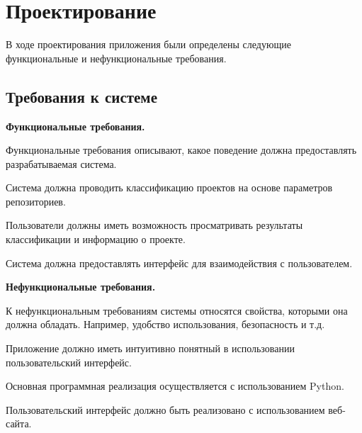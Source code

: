 \lstset{language=C, frame=L, basicstyle=\footnotesize,%
	keywordstyle=\bfseries, showstringspaces=false, xleftmargin=\parindent, numbers=none, numberstyle=\tiny, stepnumber=2, numbersep=14pt}
\newpage
\section{Проектирование}
\label{sec:Design}
В ходе проектирования приложения были определены следующие функциональные и нефункциональные требования.
\vspace{1em}
\subsection{Требования к системе}
\label{sec:Requirements}
\textbf{Функциональные требования.}

Функциональные требования описывают, какое поведение должна предоставлять разрабатываемая система.

 \begin{enumerateparendot}
 \item Система должна проводить классификацию проектов на основе параметров репозиториев.
 
 \item Пользователи должны иметь возможность просматривать результаты классификации и информацию о проекте.
 
 \item Система должна предоставлять интерфейс для взаимодействия с пользователем.
 \end{enumerateparendot}

\textbf{Нефункциональные требования.}

К нефункциональным требованиям системы относятся свойства, которыми она должна обладать. Например, удобство использования, безопасность и т.д.

 \begin{enumerateparendot}
 \item Приложение должно иметь интуитивно понятный в использовании пользовательский интерфейс.
 
 \item Основная программная реализация осуществляется с использованием Python.
 
 \item Пользовательский интерфейс должно быть реализовано с использованием веб-сайта.
 \end{enumerateparendot}
\vspace{1em}


